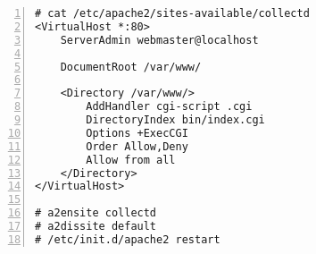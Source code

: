 \documentclass[Configuration]{subfiles}
\begin{document}
\begin{lstlisting}[frame=single,caption=Apache,backgroundcolor=\color{gray},breaklines=true,numbers=left,]
# cat /etc/apache2/sites-available/collectd 
<VirtualHost *:80>
    ServerAdmin webmaster@localhost

    DocumentRoot /var/www/

    <Directory /var/www/>
        AddHandler cgi-script .cgi
        DirectoryIndex bin/index.cgi
        Options +ExecCGI
        Order Allow,Deny
        Allow from all
    </Directory>
</VirtualHost> 

# a2ensite collectd
# a2dissite default
# /etc/init.d/apache2 restart
\end{lstlisting}
\end{document}
